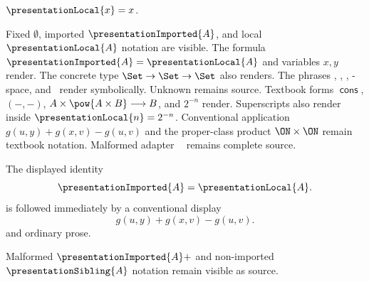 

\begin{definition}\label{presentation_local}
    $\presentationLocal{x}=x$.
\end{definition}

Fixed $\emptyset$, imported $\presentationImported{A}$, and local
$\presentationLocal{A}$ notation are visible.  The formula
$\presentationImported{A}=\presentationLocal{A}$ and variables $x,y$ render.
The concrete type $\Set\to\Set\to\Set$ also renders.
The phrases \teezero, \teeone, \teetwo, \teethree-space, and
\teefour\ render symbolically.  Unknown \presentationUnknown remains source.
Textbook forms $\operatorname{\textsf{cons}}$, $({-},{-})$,
$A\times\pow{A\times B}\longrightarrow B$, and $2^{-n}$ render.
Superscripts also render inside $\presentationLocal{n}=2^{-n}$.
Conventional application $g(u,y)+g(x,v)-g(u,v)$ and the proper-class product
$\ON\times\ON$ remain textbook notation.
Malformed adapter $\operatorname{\textsf{}}$ remains complete source.

The displayed identity
\[
    \presentationImported{A}=\presentationLocal{A}.
\]
is followed immediately by a conventional display
\[
    g(u,y)+g(x,v)-g(u,v).
\]
and ordinary prose.

Malformed $\presentationImported{A}+$ and non-imported
$\presentationSibling{A}$ notation remain visible as source.

